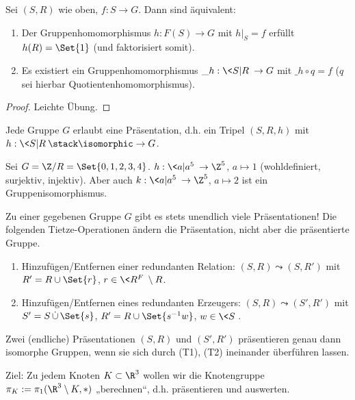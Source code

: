 \begin{st}
    Sei $(S,R)$ wie oben, $f : S \to G$.
    Dann sind äquivalent:
    \begin{enumerate}[1)]
        \item
            Der Gruppenhomomorphismus $h: F(S) \to G$ mit $h|_S = f$ erfüllt $h(R) = \Set{1}$ (und faktorisiert somit).
        \item
            Es existiert ein Gruppenhomomorphismus $\_h: \<S|R\> \to G$ mit $\_h \circ q = f$ ($q$ sei hierbar Quotientenhomomorphismus).
    \end{enumerate}
    \begin{proof}
        Leichte Übung.
    \end{proof}
\end{st}

\begin{prop}
    Jede Gruppe $G$ erlaubt eine Präsentation, d.h. ein Tripel $(S,R,h)$ mit $h: \<S | R\> \stack\isomorphic\to G$.
\end{prop}

\begin{ex}
    Sei $G = \Z / R = \Set{0,1,2,3,4}$.
    $h: \< a | a^5\> \to \Z^5$, $a \mapsto 1$ (wohldefiniert, surjektiv, injektiv).
    Aber auch $k: \<a|a^5\> \to \Z^5$, $a \mapsto 2$ ist ein Gruppenisomorphismus.
\end{ex}

Zu einer gegebenen Gruppe $G$ gibt es stets unendlich viele Präsentationen!
Die folgenden Tietze-Operationen ändern die Präsentation, nicht aber die präsentierte Gruppe.
\begin{enumerate}[(T1)]
    \item
        Hinzufügen/Entfernen einer redundanten Relation: $(S,R) \leadsto (S,R')$ mit $R' = R \cup \Set{r}$, $r \in \<R^F\> \setminus R$.
    \item
        Hinzufügen/Entfernen eines redundanten Erzeugers: $(S,R) \leadsto (S',R')$ mit $S' = S \dotcup \Set{s}$, $R' = R \cup \Set{s^{-1} w}$, $w \in \<S\>$.
\end{enumerate}

\begin{st}[Tietze, 1908]
    Zwei (endliche) Präsentationen $(S,R)$ und $(S',R')$ präsentieren genau dann isomorphe Gruppen, wenn sie sich durch (T1), (T2) ineinander überführen lassen.
\end{st}


Ziel: Zu jedem Knoten $K \subset \R^3$ wollen wir die Knotengruppe $\pi_K := \pi_1(\R^3 \setminus K, *)$ „berechnen“, d.h. präsentieren und auswerten.


